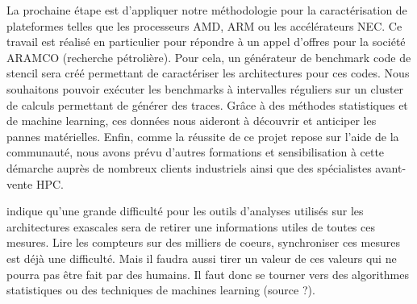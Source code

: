 La prochaine étape est d’appliquer notre méthodologie pour la caractérisation de plateformes telles que les processeurs AMD, ARM ou les accélérateurs NEC. Ce travail est réalisé en particulier pour répondre à un appel d’offres pour la société ARAMCO (recherche pétrolière). Pour cela, un générateur de benchmark code de stencil  sera créé permettant de caractériser les architectures pour ces codes. Nous souhaitons pouvoir exécuter les benchmarks à intervalles réguliers sur un cluster de calculs permettant de générer des traces. Grâce à des méthodes statistiques et de machine learning, ces données nous aideront à découvrir et anticiper les pannes matérielles. Enfin, comme la réussite de ce projet repose sur l’aide de la communauté, nous avons prévu d’autres formations et sensibilisation à cette démarche auprès de nombreux clients industriels ainsi que des spécialistes avant-vente HPC.


  \cite{Straatsma2017} indique qu’une grande difficulté pour les outils d’analyses utilisés sur les architectures exascales sera de retirer une informations utiles de toutes ces mesures. Lire les compteurs sur des milliers de coeurs, synchroniser ces mesures est déjà une difficulté. Mais il faudra aussi tirer un valeur de ces valeurs qui ne pourra pas être fait par des humains. Il faut donc se tourner vers des algorithmes statistiques ou des techniques de machines learning (source ?).



